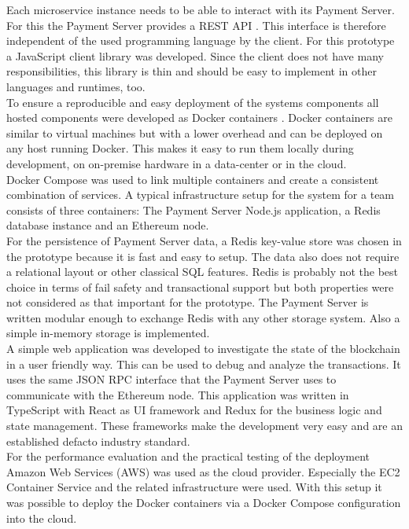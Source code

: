 \documentclass[a4paper,12pt]{scrartcl}
\begin{document}
Each microservice instance needs to be able to interact with its Payment Server. For this the Payment Server provides a REST API \cite{fielding2000architectural}. This interface is therefore independent of the used programming language by the client. For this prototype a JavaScript client library was developed. Since the client does not have many responsibilities, this library is thin and should be easy to implement in other languages and runtimes, too.\\

To ensure a reproducible and easy deployment of the systems components all hosted components were developed as Docker containers \cite{web33}. Docker containers are similar to virtual machines but with a lower overhead and can be deployed on any host running Docker. This makes it easy to run them locally during development, on on-premise hardware in a data-center or in the cloud.\\
Docker Compose \cite{web34} was used to link multiple containers and create a consistent combination of services. A typical infrastructure setup for the system for a team consists of three containers: The Payment Server Node.js application, a Redis database instance and an Ethereum node.\\

For the persistence of Payment Server data, a Redis \cite{web35} key-value store was chosen in the prototype because it is fast and easy to setup. The data also does not require a relational layout or other classical SQL features. Redis is probably not the best choice in terms of fail safety and transactional support but both properties were not considered as that important for the prototype. The Payment Server is written modular enough to exchange Redis with any other storage system. Also a simple in-memory storage is implemented.\\

A simple web application was developed to investigate the state of the blockchain in a user friendly way. This can be used to debug and analyze the transactions. It uses the same JSON RPC interface \cite{web23} that the Payment Server uses to communicate with the Ethereum node. This application was written in TypeScript \cite{web25} with React \cite{web36} as UI framework and Redux \cite{web37} for the business logic and state management. These frameworks make the development very easy and are an established defacto industry standard.\\

For the performance evaluation and the practical testing of the deployment Amazon Web Services (AWS) \cite{web38} was used as the cloud provider. Especially the EC2 Container Service \cite{web39} and the related infrastructure were used. With this setup it was possible to deploy the Docker containers via a Docker Compose configuration into the cloud.
\end{document}
